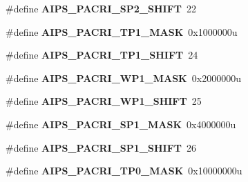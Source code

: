 \begin{DoxyCompactItemize}
\item 
\#define {\bfseries A\+I\+P\+S\+\_\+\+P\+A\+C\+R\+I\+\_\+\+S\+P2\+\_\+\+S\+H\+I\+FT}~22\hypertarget{group__AIPS__Register__Masks_ga34d206e4644b39811d4cdebae9aeaad1}{}\label{group__AIPS__Register__Masks_ga34d206e4644b39811d4cdebae9aeaad1}

\item 
\#define {\bfseries A\+I\+P\+S\+\_\+\+P\+A\+C\+R\+I\+\_\+\+T\+P1\+\_\+\+M\+A\+SK}~0x1000000u\hypertarget{group__AIPS__Register__Masks_gab3d1df499e2d19b5205f506473b75598}{}\label{group__AIPS__Register__Masks_gab3d1df499e2d19b5205f506473b75598}

\item 
\#define {\bfseries A\+I\+P\+S\+\_\+\+P\+A\+C\+R\+I\+\_\+\+T\+P1\+\_\+\+S\+H\+I\+FT}~24\hypertarget{group__AIPS__Register__Masks_ga2c7ce4fcebcb8463b5e545c38816163c}{}\label{group__AIPS__Register__Masks_ga2c7ce4fcebcb8463b5e545c38816163c}

\item 
\#define {\bfseries A\+I\+P\+S\+\_\+\+P\+A\+C\+R\+I\+\_\+\+W\+P1\+\_\+\+M\+A\+SK}~0x2000000u\hypertarget{group__AIPS__Register__Masks_ga2066be7a51afdec01b811bed88f0bdbe}{}\label{group__AIPS__Register__Masks_ga2066be7a51afdec01b811bed88f0bdbe}

\item 
\#define {\bfseries A\+I\+P\+S\+\_\+\+P\+A\+C\+R\+I\+\_\+\+W\+P1\+\_\+\+S\+H\+I\+FT}~25\hypertarget{group__AIPS__Register__Masks_gac135a5f861bdf3228c81b7f16a800e47}{}\label{group__AIPS__Register__Masks_gac135a5f861bdf3228c81b7f16a800e47}

\item 
\#define {\bfseries A\+I\+P\+S\+\_\+\+P\+A\+C\+R\+I\+\_\+\+S\+P1\+\_\+\+M\+A\+SK}~0x4000000u\hypertarget{group__AIPS__Register__Masks_ga7ca164d2f33178f4aed31fd5d62296af}{}\label{group__AIPS__Register__Masks_ga7ca164d2f33178f4aed31fd5d62296af}

\item 
\#define {\bfseries A\+I\+P\+S\+\_\+\+P\+A\+C\+R\+I\+\_\+\+S\+P1\+\_\+\+S\+H\+I\+FT}~26\hypertarget{group__AIPS__Register__Masks_ga246f4e35b609e9445b386265483c6dea}{}\label{group__AIPS__Register__Masks_ga246f4e35b609e9445b386265483c6dea}

\item 
\#define {\bfseries A\+I\+P\+S\+\_\+\+P\+A\+C\+R\+I\+\_\+\+T\+P0\+\_\+\+M\+A\+SK}~0x10000000u\hypertarget{group__AIPS__Register__Masks_gae7fc50bf35e262b9543a490b6d91370a}{}\label{group__AIPS__Register__Masks_gae7fc50bf35e262b9543a490b6d91370a}


\end{DoxyCompactItemize}
